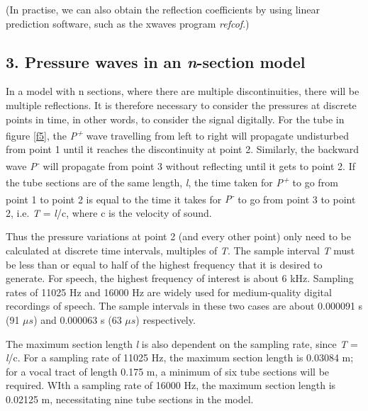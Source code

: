 \bigskip

(In practise, we can also obtain the reflection coefficients by using linear prediction software, such as the xwaves program \textit{refcof}.)

\subsection*{3. Pressure waves in an \textit{n}-section model}

In a model with n sections, where there are multiple discontinuities, there will be multiple reflections. It is therefore necessary to consider the pressures at discrete points in time, in other words, to consider the signal digitally. For the tube in figure \ref{f5}, the \textit{P\textsuperscript{+}} wave travelling from left to right will propagate undisturbed from point 1 until it reaches the discontinuity at point 2. Similarly, the backward wave \textit{P\textsuperscript{-}} will propagate from point 3 without reflecting until it gets to point 2. If the tube sections are of the same length, \textit{l}, the time taken for \textit{P\textsuperscript{+}} to go from point 1 to point 2 is equal to the time it takes for \textit{P\textsuperscript{-}} to go from point 3 to point 2, i.e. \textit{T} = \textit{l}/c, where c is the velocity of sound.

\bigskip

Thus the pressure variations at point 2 (and every other point) only need to be calculated at discrete time intervals, multiples of \textit{T}. The sample interval \textit{T} must be less than or equal to half of the highest frequency that it is desired to generate. For speech, the highest frequency of interest is about 6 kHz. Sampling rates of 11025 Hz and 16000 Hz are widely used for medium-quality digital recordings of speech. The sample intervals in these two cases are about 0.000091 s (91 $\mu s$) and 0.000063 s (63 $\mu s$) respectively.

\bigskip

The maximum section length \textit{l} is also dependent on the sampling rate, since \textit{T} = \textit{l}/c. For a sampling rate of 11025 Hz, the maximum section length is 0.03084 m; for a vocal tract of length 0.175 m, a minimum of six tube sections will be required. WIth a sampling rate of 16000 Hz, the maximum section length is 0.02125 m, necessitating nine tube sections in the model.

\bigskip

